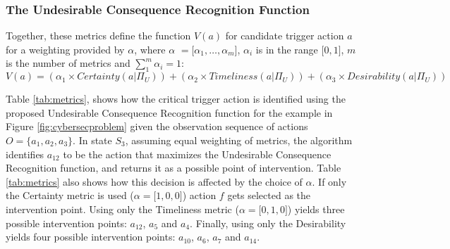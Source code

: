 \subsubsection{The Undesirable Consequence Recognition Function}
Together, these metrics define the function $V(a)$ for candidate trigger action $a$ for a weighting provided by $\alpha$, where $\alpha$ $=\lbrack\alpha_1, \ldots, \alpha_m \rbrack$, $\alpha_i$ is in the range $\lbrack0,1\rbrack$, $m$ is the number of metrics and $\sum_{1}^{m}\alpha_i = 1$:
\begin{equation}
\label{eq:function}
V(a) = (\alpha_1 \times Certainty (a|\Pi_U)) + (\alpha_2 \times Timeliness (a|\Pi_U)) + (\alpha_3 \times Desirability (a|\Pi_U))
\end{equation}

Table \ref{tab:metrics}, shows how the critical trigger action is identified using the proposed Undesirable Consequence Recognition function for the example in Figure \ref{fig:cybersecproblem} given the observation sequence of actions $O=\{a_1, a_2, a_3\}$. 
In state $S_{3}$, assuming equal weighting of metrics, the algorithm identifies $a_{12}$ to be the action that maximizes the Undesirable Consequence Recognition function, and returns it as a possible point of intervention. 
Table \ref{tab:metrics} also shows how this decision is affected by the choice of $\alpha$. If only the Certainty metric is used ($\alpha=\lbrack1,0,0\rbrack$) action $f$ gets selected as the intervention point. 
Using only the Timeliness metric ($\alpha=\lbrack0,1,0\rbrack$) yields three possible intervention points: $a_{12}$, $a_5$ and $a_4$. 
Finally, using only the Desirability yields four possible intervention points: $a_{10}$, $a_6$, $a_7$ and $a_{14}$.

